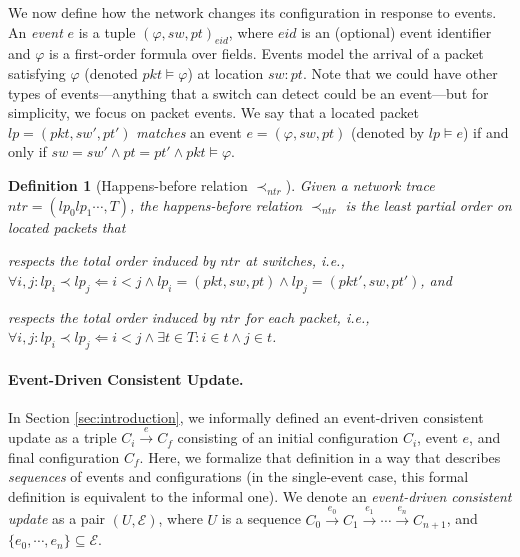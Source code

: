 \documentclass[pldi-cameraready]{sigplanconf}
\newcommand{\port}{\ensuremath{\mathit{pt}}}
\newcommand{\switch}{\ensuremath{\mathit{sw}}}
\newcommand{\lpt}{\ensuremath{\mathit{lp}}}
\newcommand{\ntr}{\ensuremath{\mathit{ntr}}}
\newcommand{\eid}{\ensuremath{\mathit{eid}}}
\newcommand{\pkt}{\ensuremath{\mathit{pkt}}}
\newtheorem{definition}{Definition}
\begin{document}
We now define how the network changes its configuration in response to
events.  An {\em event} $e$ is a tuple $(\varphi,\switch,\port)_{\eid}$,
where $\eid$ is an (optional) event identifier and $\varphi$ is a first-order formula over
fields. Events model the arrival of a packet satisfying $\varphi$ (denoted $\pkt \models \varphi$) at
location $\switch{:}\port$.  Note that we could have other types of events---anything that a switch can
detect could be an event---but for simplicity, we focus on packet
events.
We say that a located packet $\lpt = (\pkt,\switch',\port')$ {\em matches}
an event $e=(\varphi,\switch,\port)$ (denoted by $\lpt \models
e$) if and only if $\switch=\switch' \land \port=\port' \land \pkt \models \varphi$.


\begin{definition}[Happens-before relation $\prec_\ntr$]
Given a network trace $\ntr = (\lpt_0 \lpt_1 \cdots, T)$, the
happens-before relation $\prec_\ntr$ is the least partial order on
located packets that
\begin{compactitem}
\item respects the total order induced by $\ntr$ at switches, i.e.,
  $\forall i,j : \lpt_i \prec \lpt_j \Leftarrow i<j \land \lpt_i=
  (\pkt,\switch,\port) \land \lpt_j= (\pkt',\switch,\port')$, and
\item respects the total order induced by $\ntr$ for each packet,
  i.e., $\forall i,j : \lpt_i \prec \lpt_j \Leftarrow i<j \land
\exists t \in T : i \in t \land j \in t$.
\end{compactitem}
\end{definition}

\paragraph*{Event-Driven Consistent Update.}
In Section \ref{sec:introduction}, we informally defined an
event-driven consistent update
as a triple $C_i \xrightarrow{e} C_f$ consisting of an initial configuration $C_i$,
event $e$, and final configuration $C_f$. 
Here, we formalize that definition in a way that describes
{\em sequences} of events and configurations (in the single-event case,
this formal definition is equivalent to the informal one).
We denote an {\em event-driven consistent update} as a pair $(U,\mathcal{E})$, where
$U$ is a sequence
$C_0 \xrightarrow{e_0} C_1 \xrightarrow{e_1} \cdots
\xrightarrow{e_{n}} C_{n+1}$,
and $\{e_0,\cdots,e_n\} \subseteq \mathcal{E}$.
\end{document}
